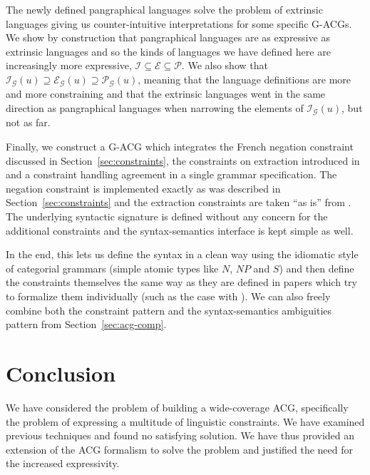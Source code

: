 \documentclass[twocolumn]{article}
\begin{document}
The newly defined pangraphical languages solve the problem of extrinsic
languages giving us counter-intuitive interpretations for some specific
G-ACGs. We show by construction that pangraphical languages are as
expressive as extrinsic languages and so the kinds of languages we have
defined here are increasingly more expressive, $\mathcal{I} \subseteq
\mathcal{E} \subseteq \mathcal{P}$. We also show that
$\mathcal{I}_{\mathcal{G}}(u) \supseteq \mathcal{E}_{\mathcal{G}}(u)
\supseteq \mathcal{P}_{\mathcal{G}}(u)$, meaning that the language
definitions are more and more constraining and that the extrinsic
languages went in the same direction as pangraphical languages when
narrowing the elements of $\mathcal{I}_{\mathcal{G}}(u)$, but not as
far.

Finally, we construct a G-ACG which integrates the French negation
constraint discussed in Section~\ref{sec:constraints}, the constraints
on extraction introduced in \cite{pogodalla2012controlling} and a
constraint handling agreement in a single grammar specification. The
negation constraint is implemented exactly as was described in
Section~\ref{sec:constraints} and the extraction constraints are taken
``as is'' from \cite{pogodalla2012controlling}. The underlying syntactic
signature is defined without any concern for the additional constraints
and the syntax-semantics interface is kept simple as well.

In the end, this lets us define the syntax in a clean way using the
idiomatic style of categorial grammars (simple atomic types like $N$,
$NP$ and $S$) and then define the constraints themselves the same way as
they are defined in papers which try to formalize them individually
(such as the case with \cite{pogodalla2012controlling}). We can also
freely combine both the constraint pattern and the syntax-semantics
ambiguities pattern from Section~\ref{sec:acg-comp}.


\section{Conclusion}

We have considered the problem of building a wide-coverage ACG, specifically
the problem of expressing a multitude of linguistic constraints. We have
examined previous techniques and found no satisfying solution. We have thus
provided an extension of the ACG formalism to solve the problem and justified
the need for the increased expressivity.



\end{document}
